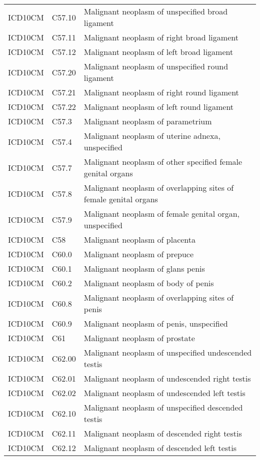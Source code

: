 \begin{longtable}{p{}p{}p{}}
  ICD10CM & C57.10 & Malignant neoplasm of unspecified broad ligament \\ 
  ICD10CM & C57.11 & Malignant neoplasm of right broad ligament \\ 
  ICD10CM & C57.12 & Malignant neoplasm of left broad ligament \\ 
  ICD10CM & C57.20 & Malignant neoplasm of unspecified round ligament \\ 
  ICD10CM & C57.21 & Malignant neoplasm of right round ligament \\ 
  ICD10CM & C57.22 & Malignant neoplasm of left round ligament \\ 
  ICD10CM & C57.3 & Malignant neoplasm of parametrium \\ 
  ICD10CM & C57.4 & Malignant neoplasm of uterine adnexa, unspecified \\ 
  ICD10CM & C57.7 & Malignant neoplasm of other specified female genital organs \\ 
  ICD10CM & C57.8 & Malignant neoplasm of overlapping sites of female genital organs \\ 
  ICD10CM & C57.9 & Malignant neoplasm of female genital organ, unspecified \\ 
  ICD10CM & C58 & Malignant neoplasm of placenta \\ 
  ICD10CM & C60.0 & Malignant neoplasm of prepuce \\ 
  ICD10CM & C60.1 & Malignant neoplasm of glans penis \\ 
  ICD10CM & C60.2 & Malignant neoplasm of body of penis \\ 
  ICD10CM & C60.8 & Malignant neoplasm of overlapping sites of penis \\ 
  ICD10CM & C60.9 & Malignant neoplasm of penis, unspecified \\ 
  ICD10CM & C61 & Malignant neoplasm of prostate \\ 
  ICD10CM & C62.00 & Malignant neoplasm of unspecified undescended testis \\ 
  ICD10CM & C62.01 & Malignant neoplasm of undescended right testis \\ 
  ICD10CM & C62.02 & Malignant neoplasm of undescended left testis \\ 
  ICD10CM & C62.10 & Malignant neoplasm of unspecified descended testis \\ 
  ICD10CM & C62.11 & Malignant neoplasm of descended right testis \\ 
  ICD10CM & C62.12 & Malignant neoplasm of descended left testis \\ 

\end{longtable}
